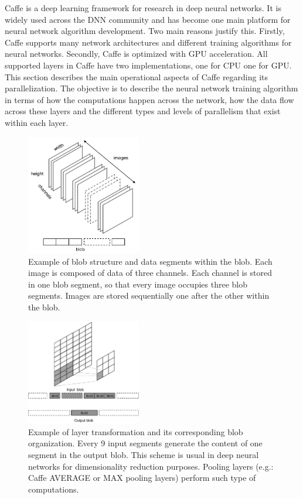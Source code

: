 Caffe is a deep learning framework for research in deep neural
networks. It is widely used across the DNN community
and has become one main platform for neural network algorithm development. 
Two main reasons justify this. Firstly, Caffe supports
many network architectures and different training algorithms for
neural networks. Secondly, Caffe is optimized with GPU acceleration.
All supported layers in Caffe have two implementations, one for CPU 
one for GPU. This section describes the main operational aspects 
of Caffe regarding its parallelization. 
The objective is to describe the neural network 
training algorithm in terms of how the computations happen across 
the network, how the data flow across these layers 
and the different types and levels of parallelism that exist within each layer.


\begin{figure}[]
\centering
\includegraphics[width=5cm]{figures/blob1.pdf}
\caption{Example of blob structure and data segments within the blob. Each image is composed of data of three channels. Each channel is stored in one blob segment, so that every image occupies three blob segments. Images are stored sequentially one after the other within the blob.}
\label{fig-blob}
\end{figure}

\begin{figure}[]
\centering
\includegraphics[width=5cm]{figures/blob2.pdf}
\caption{Example of layer transformation and its corresponding blob organization. Every 9 input segments generate the content of one segment in the output blob. This scheme is usual in deep neural networks for dimensionality reduction purposes. Pooling layers (e.g.: Caffe AVERAGE or MAX pooling layers) perform such type of computations.}
\label{fig-blob-trans}
\end{figure}

